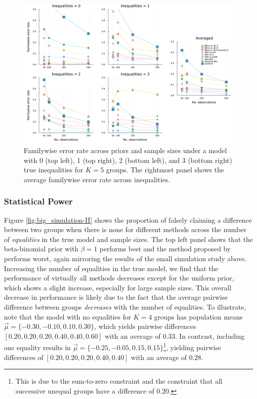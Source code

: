 \documentclass[11pt,a4paper]{article}
\theoremstyle{definition} %
\theoremstyle{case}
\begin{document}
\begin{figure}[!h]
    \centering
    \includegraphics[width=1\textwidth]{figures/subset_k_5_alpha_familywise.pdf}
    \caption{Familywise error rate across priors and sample sizes under a model with 0 (top left), 1 (top right), 2 (bottom left), and 3 (bottom right) true inequalities for $K = 5$ groups. The rightmost panel shows the average familywise error rate across inequalities.}
    \label{fig:big_simulation-I}
\end{figure}

\subsubsection{Statistical Power}
Figure \ref{fig:big_simulation-II} shows the proportion of falsely claiming a difference between two groups when there is none for different methods across the number of \textit{equalities} in the true model and sample sizes. The top left panel shows that the beta-binomial prior with $\beta = 1$ performs best and the method proposed by \textcite{westfall1997bayesian} performs worst, again mirroring the results of the small simulation study above. Increasing the number of equalities in the true model, we find that the performance of virtually all methods decreases except for the uniform prior, which shows a slight increase, especially for large sample sizes. This overall decrease in performance is likely due to the fact that the average pairwise difference between groups \textit{decreases} with the number of equalities. To illustrate, note that the model with no equalities for $K = 4$ groups has population means $\vec{\mu} = \{-0.30, -0.10, 0.10, 0.30\}$, which yields pairwise differences $[0.20, 0.20, 0.20, 0.40, 0.40, 0.60]$ with an average of $0.33$. In contrast, including one equality results in $\vec{\mu} = \{-0.25, -0.05, 0.15, 0.15\}$\footnote{This is due to the sum-to-zero constraint and the constraint that all successive unequal groups have a difference of $0.20$.}, yielding pairwise differences of $[0.20, 0.20, 0.20, 0.40, 0.40]$ with an average of $0.28$.
\end{document}

